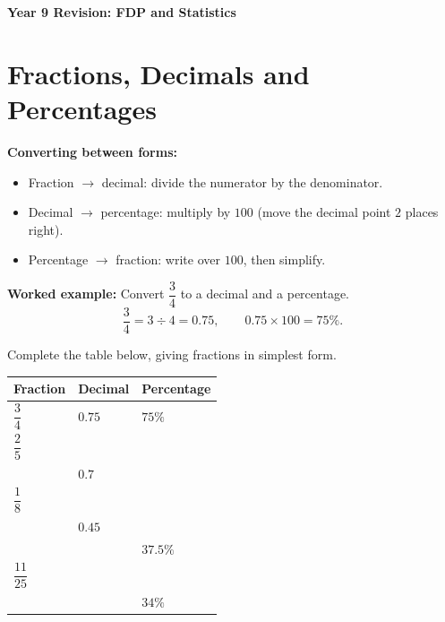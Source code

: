 \documentclass[11pt]{article}
\begin{document}
\thispagestyle{firstpage}

\begin{center}
  {\Large\bfseries Year 9 Revision: FDP and Statistics}
\end{center}
\vspace{0.3em}

\section{Fractions, Decimals and Percentages}

\noindent\textbf{Converting between forms:}
\begin{itemize}[leftmargin=1.4em, itemsep=0.2em, topsep=0.2em]
  \item Fraction $\to$ decimal: divide the numerator by the denominator.
  \item Decimal $\to$ percentage: multiply by $100$ (move the decimal point $2$ places right).
  \item Percentage $\to$ fraction: write over $100$, then simplify.
\end{itemize}

\vspace{0.3em}
\noindent\textbf{Worked example:} Convert $\dfrac{3}{4}$ to a decimal and a percentage.
\[
  \frac{3}{4} = 3 \div 4 = 0.75, \qquad 0.75 \times 100 = 75\%.
\]

\vspace{0.4em}
\noindent Complete the table below, giving fractions in simplest form.

\begin{center}
\begin{tabular}{|Y|Y|Y|}
\hline
\textbf{Fraction} & \textbf{Decimal} & \textbf{Percentage} \\\hline
$\dfrac{3}{4}$ & $0.75$ & $75\%$ \\[0.6em]\hline
$\dfrac{2}{5}$ & & \\[0.9em]\hline
 & $0.7$ & \\[0.9em]\hline
$\dfrac{1}{8}$ & & \\[0.9em]\hline
 & $0.45$ & \\[0.9em]\hline
 & & $37.5\%$ \\[0.9em]\hline
$\dfrac{11}{25}$ & & \\[0.9em]\hline
 & & $34\%$ \\[0.9em]\hline
\end{tabular}
\end{center}

\newpage
\end{document}

